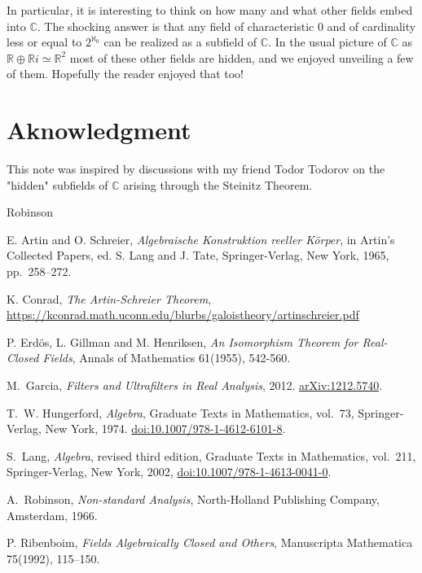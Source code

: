 \documentclass[11pt]{article}
\theoremstyle{plain}
\theoremstyle{definition}
\theoremstyle{remark}
\begin{document}
In particular, it is interesting to think on how many and what other fields embed into $\mathbb{C}$. The shocking answer is that any field of characteristic $0$ and of cardinality less or equal to $2^{\aleph_0}$ can be realized as a subfield of $\mathbb{C}$. In the usual picture of $\mathbb{C}$ as $\mathbb{R} \oplus \mathbb{R}i \simeq \mathbb{R}^2$ most of these other fields are hidden, and we enjoyed unveiling a few of them. Hopefully the reader enjoyed that too! 

\section*{Aknowledgment}
This note was inspired by discussions with my friend Todor Todorov on the "hidden" subfields of $\mathbb{C}$ arising through the Steinitz Theorem.
\begin{thebibliography}{Robinson}

    E. Artin and O. Schreier,
    \textit{Algebraische Konstruktion reeller K{\"o}rper}, in Artin's Collected Papers,
    ed. S. Lang and J. Tate,
    Springer-Verlag, New York, 1965, pp.~258--272.
    
    K. Conrad,
    \textit{The Artin-Schreier Theorem},
    {\url{https://kconrad.math.uconn.edu/blurbs/galoistheory/artinschreier.pdf}}
    
     P. Erdös, L. Gillman and M. Henriksen, \textit{An Isomorphism Theorem for
    Real-Closed Fields}, Annals of Mathematics 61(1955), 542-560.

    M.~Garcia, \textit{Filters and Ultrafilters in Real Analysis}, 2012. \href{https://arxiv.org/abs/1212.5740}{arXiv:1212.5740}.
    
    T.~W. Hungerford, \textit{Algebra}, Graduate Texts in Mathematics, vol.~73, Springer-Verlag, New York, 1974. \href{https://doi.org/10.1007/978-1-4612-6101-8}{doi:10.1007/978-1-4612-6101-8}.
    
    S.~Lang, \textit{Algebra}, revised third edition, Graduate Texts in Mathematics, vol.~211, Springer-Verlag, New York, 2002, \href{https://doi.org/10.1007/978-1-4613-0041-0}{doi:10.1007/978-1-4613-0041-0}.
    
    A.~Robinson, \textit{Non-standard Analysis}, North-Holland Publishing Company, Amsterdam, 1966.
    
    P. Ribenboim,
    \textit{Fields Algebraically Closed and Others},
    Manuscripta Mathematica 75(1992), 115--150.


\end{thebibliography}
\end{document}
